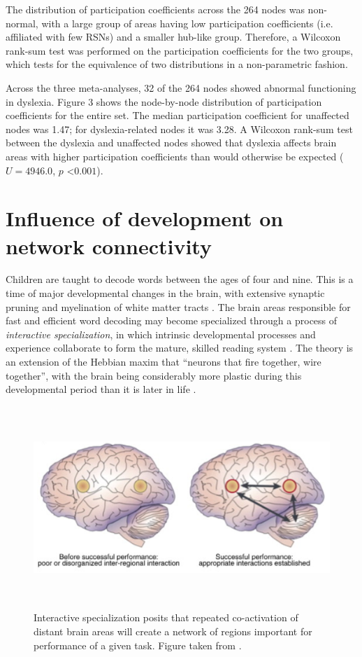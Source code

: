 The distribution of participation coefficients across the 264 nodes was non-normal, with a large group of areas having low participation coefficients (i.e. affiliated with few RSNs) and a smaller hub-like group. Therefore, a Wilcoxon rank-sum test was performed on the participation coefficients for the two groups, which tests for the equivalence of two distributions in a non-parametric fashion.

Across the three meta-analyses, 32 of the 264 nodes showed abnormal functioning in dyslexia. Figure 3 shows the node-by-node distribution of participation coefficients for the entire set. The median participation coefficient for unaffected nodes was 1.47; for dyslexia-related nodes it was 3.28. A Wilcoxon rank-sum test between the dyslexia and unaffected nodes showed that dyslexia affects brain areas with higher participation coefficients than would otherwise be expected ($U = 4946.0$, $p$ \textless $0.001$). 


\section{Influence of development on network connectivity}

Children are taught to decode words between the ages of four and nine. This is a time of major developmental changes in the brain, with extensive synaptic pruning and myelination of white matter tracts \citep{Wandell2013}. The brain areas responsible for fast and efficient word decoding may become specialized through a process of \textit{interactive specialization}, in which intrinsic developmental processes and experience collaborate to form the mature, skilled reading system \citep{Johnson2011, Klingberg2014}. The theory is an extension of the Hebbian maxim that ``neurons that fire together, wire together'', with the brain being considerably more plastic during this developmental period than it is later in life \citep{Hebb1949}.

\begin{figure}[h!]
\centering
\includegraphics[height=3in]{images/ch1-interactive-specialization.jpg}
    \caption[Interactive specialization explains changes in activity.]{Interactive specialization posits that repeated co-activation of distant brain areas will create a network of regions important for performance of a given task. Figure taken from \citep{Gaffrey2013}.}
\label{fig:ch1-interactive-specialization}
\end{figure}

